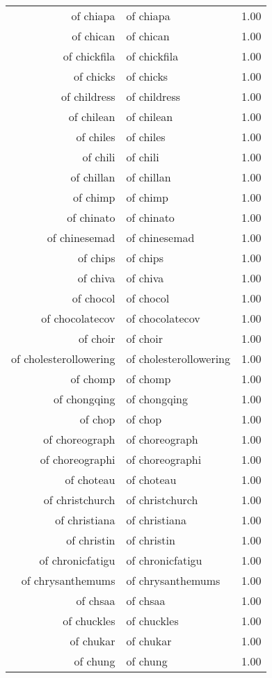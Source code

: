 \begin{table}[ht]
\begin{tabular}{rlr}
  of chiapa & of chiapa & 1.00 \\ 
  of chican & of chican & 1.00 \\ 
  of chickfila & of chickfila & 1.00 \\ 
  of chicks & of chicks & 1.00 \\ 
  of childress & of childress & 1.00 \\ 
  of chilean & of chilean & 1.00 \\ 
  of chiles & of chiles & 1.00 \\ 
  of chili & of chili & 1.00 \\ 
  of chillan & of chillan & 1.00 \\ 
  of chimp & of chimp & 1.00 \\ 
  of chinato & of chinato & 1.00 \\ 
  of chinesemad & of chinesemad & 1.00 \\ 
  of chips & of chips & 1.00 \\ 
  of chiva & of chiva & 1.00 \\ 
  of chocol & of chocol & 1.00 \\ 
  of chocolatecov & of chocolatecov & 1.00 \\ 
  of choir & of choir & 1.00 \\ 
  of cholesterollowering & of cholesterollowering & 1.00 \\ 
  of chomp & of chomp & 1.00 \\ 
  of chongqing & of chongqing & 1.00 \\ 
  of chop & of chop & 1.00 \\ 
  of choreograph & of choreograph & 1.00 \\ 
  of choreographi & of choreographi & 1.00 \\ 
  of choteau & of choteau & 1.00 \\ 
  of christchurch & of christchurch & 1.00 \\ 
  of christiana & of christiana & 1.00 \\ 
  of christin & of christin & 1.00 \\ 
  of chronicfatigu & of chronicfatigu & 1.00 \\ 
  of chrysanthemums & of chrysanthemums & 1.00 \\ 
  of chsaa & of chsaa & 1.00 \\ 
  of chuckles & of chuckles & 1.00 \\ 
  of chukar & of chukar & 1.00 \\ 
  of chung & of chung & 1.00 \\ 

\end{tabular}
\end{table}
